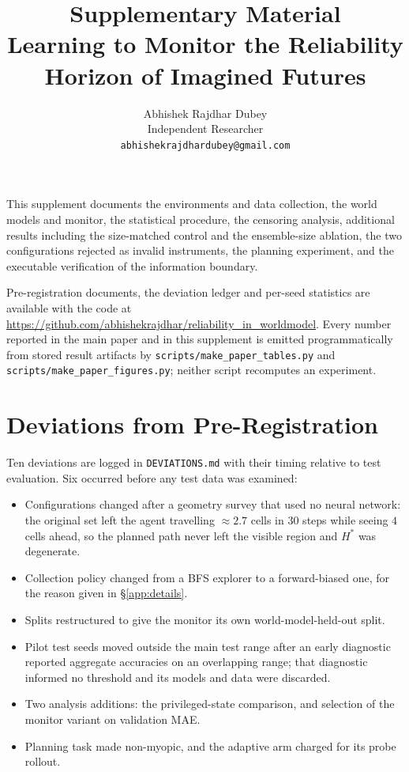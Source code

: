 \documentclass[twocolumn,10pt]{article}
\title{Supplementary Material\\\large Learning to Monitor the Reliability Horizon of
Imagined Futures}
\author{Abhishek Rajdhar Dubey \\
  Independent Researcher \\
  \texttt{abhishekrajdhardubey@gmail.com}}
\date{}
\newcommand{\Hstar}{H^{*}}
\begin{document}
\maketitle

This supplement documents the environments and data collection, the world models and monitor,
the statistical procedure, the censoring analysis, additional results including the
size-matched control and the ensemble-size ablation, the two configurations rejected as invalid
instruments, the planning experiment, and the executable verification of the information
boundary.

Pre-registration documents, the deviation ledger and per-seed statistics are available
with the code at \url{https://github.com/abhishekrajdhar/reliability_in_worldmodel}.
Every number reported in the main paper and in this supplement is emitted programmatically from
stored result artifacts by \texttt{scripts/make\_paper\_tables.py} and
\texttt{scripts/make\_paper\_figures.py}; neither script recomputes an experiment.




\section{Deviations from Pre-Registration}
\label{app:deviations}

Ten deviations are logged in \texttt{DEVIATIONS.md} with their timing relative to test
evaluation. Six occurred before any test data was examined:

\begin{itemize}\itemsep1pt
\item[D1] Configurations changed after a geometry survey that used no neural network: the
original set left the agent travelling $\approx 2.7$ cells in $30$ steps while seeing $4$ cells
ahead, so the planned path never left the visible region and $\Hstar$ was degenerate.
\item[D2] Collection policy changed from a BFS explorer to a forward-biased one, for the reason
given in \S\ref{app:details}.
\item[D3] Splits restructured to give the monitor its own world-model-held-out split.
\item[D4] Pilot test seeds moved outside the main test range after an early diagnostic reported
aggregate accuracies on an overlapping range; that diagnostic informed no threshold and its
models and data were discarded.
\item[D5] Two analysis additions: the privileged-state comparison, and selection of the monitor
variant on validation MAE.
\item[D6] Planning task made non-myopic, and the adaptive arm charged for its probe rollout.
\end{itemize}
\end{document}
